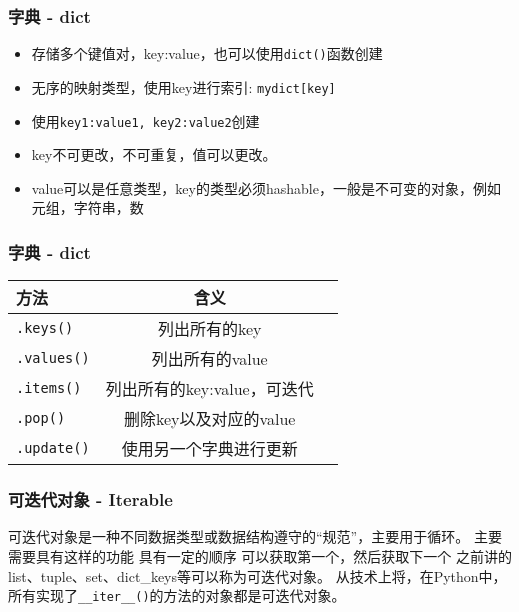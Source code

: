 \documentclass[10pt]{beamer}
\begin{document}
\begin{frame}
    \frametitle{字典 - dict}

    \begin{itemize}
        \item 存储多个键值对，key:value，也可以使用\texttt{dict()}函数创建
        \item 无序的映射类型，使用key进行索引: \texttt{mydict[key]}
        \item 使用\texttt{{key1:value1, key2:value2}}创建
        \item key不可更改，不可重复，值可以更改。
        \item value可以是任意类型，key的类型必须hashable，一般是不可变的对象，例如元组，字符串，数
    \end{itemize}

\end{frame}

\begin{frame}
    \frametitle{字典 - dict}

    \begin{table}
    \begin{tabular}{lcc} \toprule
        方法 & 含义 \\ \midrule
        \texttt{.keys()} & 列出所有的key \\
        \texttt{.values()} & 列出所有的value \\
        \texttt{.items()} & 列出所有的key:value，可迭代 \\
        \texttt{.pop()} & 删除key以及对应的value \\
        \texttt{.update()} & 使用另一个字典进行更新 \\ \bottomrule
    \end{tabular}
    \end{table}
\end{frame}


\begin{frame}
    \frametitle{可迭代对象 - Iterable}
    \begin{outline}
        \1 可迭代对象是一种不同数据类型或数据结构遵守的“规范”，主要用于循环。
        \1 主要需要具有这样的功能
            \2 具有一定的顺序
            \2 可以获取第一个，然后获取下一个
        \1 之前讲的list、tuple、set、dict\_keys等可以称为可迭代对象。
        \1 从技术上将，在Python中，所有实现了\texttt{__iter__()}的方法的对象都是可迭代对象。
    \end{outline}

\end{frame}
\end{document}
